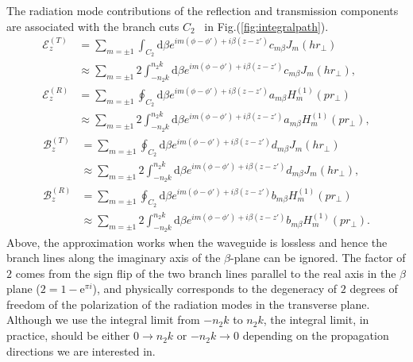 The radiation mode contributions of the reflection and transmission components are associated with the branch cuts $ C_2 $~\cite{Klimov2004} in Fig.(\ref{fig:integralpath}).
\begin{subequations}\label{ET0RC2}
\begin{align}
\mathcal{E}^{(T)}_z &= \sum_{m=\pm 1} \int_{C_2} \mathrm{d}\beta e^{im(\phi-\phi') + i\beta (z-z')} c_{m\beta} J_m (hr\!_\perp)\\
&\approx \sum_{m=\pm 1} 2\int_{-n_2k}^{n_2k} \mathrm{d}\beta e^{im(\phi-\phi') + i\beta (z-z')} c_{m\beta} J_m (hr\!_\perp),\\
\mathcal{E}^{(R)}_z &= \sum_{m=\pm 1} \oint_{C_2} \mathrm{d}\beta e^{im(\phi-\phi') + i\beta (z-z')} a_{m\beta} H_m^{(1)} (pr\!_\perp)\\
&\approx \sum_{m=\pm 1} 2\int_{-n_2k}^{n_2k} \mathrm{d}\beta e^{im(\phi-\phi') + i\beta (z-z')} a_{m\beta} H_m^{(1)} (pr\!_\perp),
\end{align}
\end{subequations}
\begin{subequations}\label{BT0RC2}
\begin{align}
\mathcal{B}^{(T)}_z &= \sum_{m=\pm 1} \oint_{C_2} \mathrm{d}\beta e^{im(\phi-\phi') + i\beta (z-z')} d_{m\beta} J_m (hr\!_\perp)\\
&\approx \sum_{m=\pm 1} 2\int_{-n_2k}^{n_2k} \mathrm{d}\beta e^{im(\phi-\phi') + i\beta (z-z')} d_{m\beta} J_m (hr\!_\perp),\\
\mathcal{B}^{(R)}_z &= \sum_{m=\pm 1} \oint_{C_2} \mathrm{d}\beta e^{im(\phi-\phi') + i\beta (z-z')} b_{m\beta} H_m^{(1)} (pr\!_\perp)\\
&\approx \sum_{m=\pm 1} 2\int_{-n_2k}^{n_2k} \mathrm{d}\beta e^{im(\phi-\phi') + i\beta (z-z')} b_{m\beta} H_m^{(1)} (pr\!_\perp).
\end{align}
\end{subequations}
Above, the approximation works when the waveguide is lossless and hence the branch lines along the imaginary axis of the $ \beta $-plane can be ignored. The factor of $ 2 $ comes from the sign flip of the two branch lines parallel to the real axis in the $ \beta $ plane ($ 2=1-\mathrm{e}^{\pi i} $), and physically corresponds to the degeneracy of $ 2 $ degrees of freedom of the polarization of the radiation modes in the transverse plane. Although we use the integral limit from $ -n_2k $ to $ n_2k $, the integral limit, in practice, should be either $ 0 \rightarrow n_2k$ or $ -n_2k\rightarrow 0 $ depending on the propagation directions we are interested in. 

